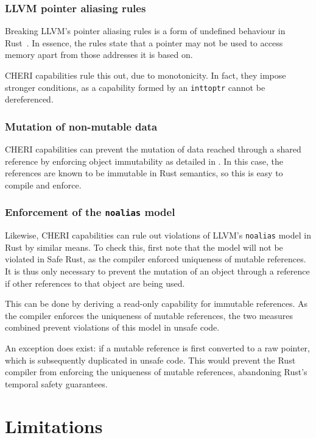 \documentclass[dissertation.tex]{subfiles}
\begin{document}
\subsubsection{LLVM pointer aliasing rules}
Breaking LLVM's pointer aliasing rules is a form of undefined behaviour
in Rust~\cite{rust-undef}.
In essence, the rules state that a pointer may not be used to access
memory apart from those addresses it is based on.

CHERI capabilities rule this out, due to monotonicity.
In fact, they impose stronger conditions, as a capability formed by an
\texttt{inttoptr} cannot be dereferenced.

\subsubsection{Mutation of non-mutable data}
CHERI capabilities can prevent the mutation of data reached through a
shared reference by enforcing object immutability as detailed in
.
In this case, the references are known to be immutable in Rust
semantics, so this is easy to compile and enforce.

\subsubsection{Enforcement of the \texttt{noalias} model}
Likewise, CHERI capabilities can rule out violations of LLVM's
\texttt{noalias} model in Rust by similar means.
To check this, first note that the model will not be violated in Safe
Rust, as the compiler enforced uniqueness of mutable references.
It is thus only necessary to prevent the mutation of an object through a
reference if other references to that object are being used.

This can be done by deriving a read-only capability for immutable
references.
As the compiler enforces the uniqueness of mutable references, the two
measures combined prevent violations of this model in unsafe code.

An exception does exist: if a mutable reference is first converted to a
raw pointer, which is subsequently duplicated in unsafe code.
This would prevent the Rust compiler from enforcing the uniqueness of
mutable references, abandoning Rust's temporal safety guarantees.


\section{Limitations}
\end{document}
